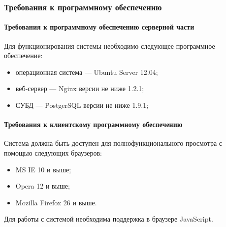 \subsubsection{Требования к программному обеспечению}


\paragraph{Требования к программному обеспечению серверной части}
Для функционирования системы необходимо следующее программное обеспечение:
\begin{itemize}
\item операционная система --– Ubuntu Server 12.04;
\item веб-сервер --– Nginx версии не ниже 1.2.1;
\item СУБД –-- PostgerSQL версии не ниже 1.9.1;
\end{itemize}

\paragraph{Требования к клиентскому программному обеспечению}
Система должна быть доступен для полнофункционального просмотра с помощью следующих браузеров:
\begin{itemize}
\item MS IE 10 и выше;
\item Opera 12 и выше;
\item Mozilla Firefox 26 и выше.
\end{itemize}
Для работы с системой необходима поддержка в браузере JavaScript.
